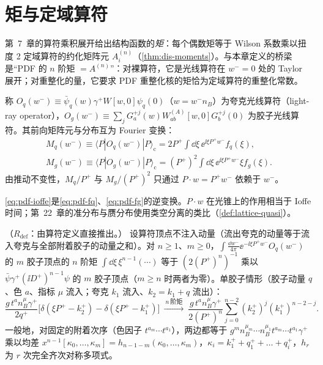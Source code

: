 \section{矩与定域算符}\label{sec:pdf-moments}

第~7~章的算符乘积展开给出结构函数的\emph{矩}：每个偶数矩等于 Wilson 系数乘以扭度 2 定域算符的约化矩阵元 $A^{(n)}_i$（\cref{thm:dis-moments}）。与本章定义的桥梁是“PDF 的 $n$ 阶矩 $=A^{(n)}$”：对裸算符，它是光线算符在 $w^-=0$ 处的 Taylor 展开；对重整化的量，它要求 PDF 重整化核的矩恰为定域算符的重整化常数。

\begin{definition}[光线算符]\label{def:pdf-lightray}
称 $O_q(w^-)\equiv\bar\psi_q(w)\gamma^+W[w,0]\psi_q(0)$（$w=w^-n_B$）为夸克光线算符（light-ray operator），$O_g(w^-)\equiv\sum_jG^{+j}_a(w)W^{(A)}_{ab}[w,0]G^{+j}_b(0)$ 为胶子光线算符。其前向矩阵元与分布互为 Fourier 变换：
\begin{equation}\label{eq:pdf-ioffe}
\begin{gathered}
M_q(w^-)\equiv\langle P|O_q(w^-)|P\rangle_{\mathrm c}=2P^+\!\int\!\dd\xi\,\ee^{\ii\xi P^+w^-}f_q(\xi),\\
M_g(w^-)\equiv\langle P|O_g(w^-)|P\rangle_{\mathrm c}=(P^+)^2\!\int\!\dd\xi\,\ee^{\ii\xi P^+w^-}\xi f_g(\xi).
\end{gathered}
\end{equation}
由推动不变性，$M_q/P^+$ 与 $M_g/(P^+)^2$ 只通过 $P\cdot w=P^+w^-$ 依赖于 $w^-$。
\end{definition}

\cref{eq:pdf-ioffe}是\cref{eq:pdf-fq}、\cref{eq:pdf-fg}的逆变换。$P\cdot w$ 在光锥上的作用相当于 Ioffe 时间；第~22~章的准分布与赝分布使用类空分离的类比（\cref{def:lattice-quasi}）。

\begin{lemma}[Wilson 线顶点的矩 = 定域算符顶点 \tagR]\label{lem:pdf-wilson-moments}
（$R_{\mathrm{def}}$：由算符定义直接推出。）
设算符顶点不注入动量（流出夸克的动量等于流入夸克与全部附着胶子的动量之和）。对 $n\ge1$、$m\ge0$，$\int\frac{\dd w^-}{4\pi}\ee^{-\ii\xi P^+w^-}O_q(w^-)$ 的 $m$ 胶子顶点的 $n$ 阶矩 $\int\dd\xi\,\xi^{n-1}(\cdots)$ 等于 $(2(P^+)^n)^{-1}$ 乘以 $\bar\psi\gamma^+(\ii D^+)^{n-1}\psi$ 的 $m$ 胶子顶点（$m\ge n$ 时两者为零）。单胶子情形（胶子动量 $q$、色 $a$、指标 $\mu$ 流入；夸克 $k_1$ 流入、$k_2=k_1+q$ 流出）：
\begin{equation}\label{eq:pdf-vertex1}
\frac{g\,t^an_B^\mu\gamma^+}{2q^+}\Big[\delta(\xi P^+-k_2^+)-\delta(\xi P^+-k_1^+)\Big]\ \xrightarrow{\ n\ \text{阶矩}\ }\ \frac{g\,t^an_B^\mu\gamma^+}{2(P^+)^n}\sum_{j=0}^{n-2}(k_2^+)^j(k_1^+)^{n-2-j}.
\end{equation}
一般地，对固定的附着次序（色因子 $t^{a_m}\cdots t^{a_1}$），两边都等于 $g^mn_B^{\mu_m}\cdots n_B^{\mu_1}t^{a_m}\cdots t^{a_1}\gamma^+$ 乘以均差 $x^{n-1}[\kappa_0,\dots,\kappa_m]=h_{n-1-m}(\kappa_0,\dots,\kappa_m)$，$\kappa_i=k_1^++q_1^++\dots+q_i^+$，$h_r$ 为 $r$ 次完全齐次对称多项式。
\end{lemma}

